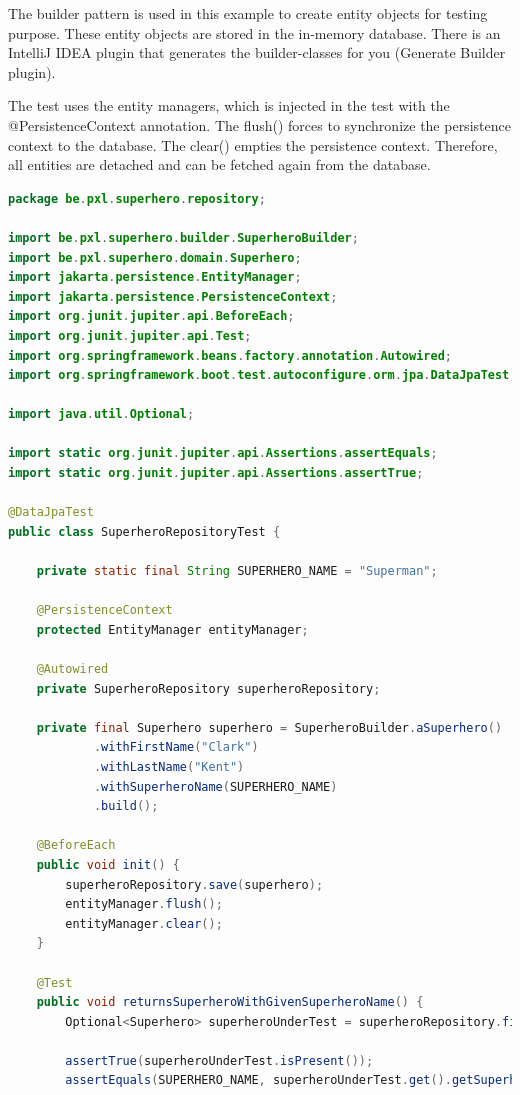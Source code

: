 \begin{itemize}
The builder pattern is used in this example to create entity objects for testing purpose. These entity objects are stored in the in-memory database. There is an IntelliJ IDEA plugin that generates the builder-classes for you (Generate Builder plugin).

The test uses the entity managers, which is injected in the test with the @PersistenceContext annotation. The flush() forces to synchronize the persistence context to the database. The clear() empties the persistence context. Therefore, all entities are detached and can be fetched again from the database.

\begin{lstlisting}[frame=single, language=java]
package be.pxl.superhero.repository;

import be.pxl.superhero.builder.SuperheroBuilder;
import be.pxl.superhero.domain.Superhero;
import jakarta.persistence.EntityManager;
import jakarta.persistence.PersistenceContext;
import org.junit.jupiter.api.BeforeEach;
import org.junit.jupiter.api.Test;
import org.springframework.beans.factory.annotation.Autowired;
import org.springframework.boot.test.autoconfigure.orm.jpa.DataJpaTest;

import java.util.Optional;

import static org.junit.jupiter.api.Assertions.assertEquals;
import static org.junit.jupiter.api.Assertions.assertTrue;

@DataJpaTest
public class SuperheroRepositoryTest {

	private static final String SUPERHERO_NAME = "Superman";

	@PersistenceContext
	protected EntityManager entityManager;

	@Autowired
	private SuperheroRepository superheroRepository;

	private final Superhero superhero = SuperheroBuilder.aSuperhero()
			.withFirstName("Clark")
			.withLastName("Kent")
			.withSuperheroName(SUPERHERO_NAME)
			.build();

	@BeforeEach
	public void init() {
		superheroRepository.save(superhero);
		entityManager.flush();
		entityManager.clear();
	}

	@Test
	public void returnsSuperheroWithGivenSuperheroName() {
		Optional<Superhero> superheroUnderTest = superheroRepository.findSuperheroBySuperheroName(SUPERHERO_NAME);

		assertTrue(superheroUnderTest.isPresent());
		assertEquals(SUPERHERO_NAME, superheroUnderTest.get().getSuperheroName());


\end{lstlisting}
\end{itemize}
